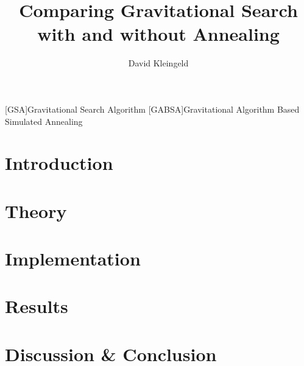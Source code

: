 \documentclass[lang=en, hanging-titles=true]{skrapport}
\title{Comparing Gravitational Search with and without Annealing}
\author[dskleingeld@gmail.com]{David Kleingeld}
\begin{document}
\maketitle
\tableofcontents

\begin{acronym}
[GSA]{Gravitational Search Algorithm}
[GABSA]{Gravitational Algorithm Based Simulated Annealing}
\end{acronym}

\section{Introduction}

\section{Theory}

\section{Implementation}

\section{Results}

\section{Discussion \& Conclusion}


\clearpage
\appendix
%
\printbibliography
\end{document}
